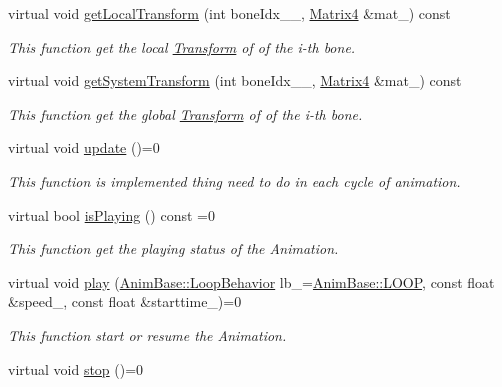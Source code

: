 \begin{DoxyCompactItemize}
virtual void \hyperlink{class_magnum_1_1_skeletal_anim_base_a3071b818530589de7f3b28c1300e6135}{get\+Local\+Transform} (int bone\+Idx\+\_\+\+\_\+, \hyperlink{class_magnum_1_1_matrix4}{Matrix4} \&mat\+\_\+) const 
\begin{DoxyCompactList}\small\item\em This function get the local \hyperlink{class_magnum_1_1_transform}{Transform} of of the i-\/th bone. \end{DoxyCompactList}\item 
virtual void \hyperlink{class_magnum_1_1_skeletal_anim_base_abfba256c345b07790b774d0f0b9cc54f}{get\+System\+Transform} (int bone\+Idx\+\_\+\+\_\+, \hyperlink{class_magnum_1_1_matrix4}{Matrix4} \&mat\+\_\+) const 
\begin{DoxyCompactList}\small\item\em This function get the global \hyperlink{class_magnum_1_1_transform}{Transform} of of the i-\/th bone. \end{DoxyCompactList}\item 
virtual void \hyperlink{class_magnum_1_1_skeletal_anim_base_a860f65cce1f9f3074dd6584262c18f35}{update} ()=0
\begin{DoxyCompactList}\small\item\em This function is implemented thing need to do in each cycle of animation. \end{DoxyCompactList}\item 
virtual bool \hyperlink{class_magnum_1_1_skeletal_anim_base_a7a28f31f6d6814b69db534eb3ef46bb6}{is\+Playing} () const  =0
\begin{DoxyCompactList}\small\item\em This function get the playing status of the Animation. \end{DoxyCompactList}\item 
virtual void \hyperlink{class_magnum_1_1_skeletal_anim_base_acbcd0a3b08336efae13457820b05aa48}{play} (\hyperlink{class_magnum_1_1_anim_base_ad6b3de9518d395df5ca9865f268ec581}{Anim\+Base\+::\+Loop\+Behavior} lb\+\_\+=\hyperlink{class_magnum_1_1_anim_base_ad6b3de9518d395df5ca9865f268ec581a8b877225f523af406db47b5a700d443f}{Anim\+Base\+::\+L\+O\+OP}, const float \&speed\+\_, const float \&starttime\+\_)=0
\begin{DoxyCompactList}\small\item\em This function start or resume the Animation. \end{DoxyCompactList}\item 
virtual void \hyperlink{class_magnum_1_1_skeletal_anim_base_ab2739547493aff29897235917b7be270}{stop} ()=0

\end{DoxyCompactItemize}

